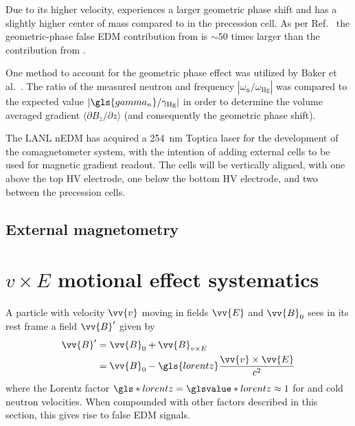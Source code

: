 Due to its higher velocity, \hg experiences a larger geometric phase shift and has a slightly higher center of mass compared to \ucn in the precession cell. As per Ref.~\cite{pendlebury_revised_2015} the geometric-phase false EDM contribution from \hg is $\sim 50$ times larger than the contribution from \ucn. 

One method to account for the geometric phase effect was utilized by Baker et al.~\cite{BAK06}. The ratio of the measured neutron and \hg frequency $|\omega_\text{n}/\omega_\text{Hg}|$ was compared to the expected value $|\gls{gamma_n}/\gamma_\text{Hg}|$ in order to determine the volume averaged gradient $\langle \partial B_z/\partial z \rangle$ (and consequently the geometric phase shift).

The LANL nEDM has acquired a \qty{254}{\nano\meter} Toptica laser for the development of the comagnetometer system, with the intention of adding external \hg cells to be used for magnetic gradient readout. The \hg cells will be vertically aligned, with one above the top HV electrode, one below the bottom HV electrode, and two between the precession cells.


\subsection{External magnetometry}\label{sec:external_magnetometry}




\section
{
    \texorpdfstring{$v\times E$ motional effect systematics}
                    {v x E motional effect systematics}\label{sec:v_cross_E}
}


A particle with velocity $\vv{v}$ moving in fields $\vv{E}$ and $\vv{B}_0$ sees in its rest frame a field $\vv{B}'$ given by
%
\begin{align}
    \vv{B}' &= \vv{B}_0+\vv{B}_{v\times E} \\
            &= \vv{B}_0-\gls{lorentz}\frac{\vv{v}\times\vv{E}}{c^2}
\end{align}
%
where the Lorentz factor $\gls*{lorentz}=\glsvalue*{lorentz}\approx 1$ for \ucn and cold neutron velocities. When compounded with other factors described in this section, this gives rise to false EDM signals.


